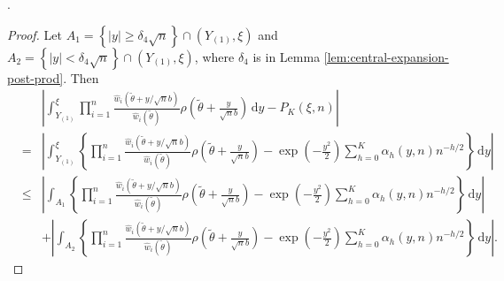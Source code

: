 \documentclass[oneside,english]{amsbook}
\numberwithin{section}{chapter}
\numberwithin{equation}{section}
\numberwithin{figure}{section}
\theoremstyle{plain}
\theoremstyle{plain}
\theoremstyle{definition}
\theoremstyle{plain}
\theoremstyle{plain}
\theoremstyle{remark}
\theoremstyle{definition}
\theoremstyle{definition}
\newcommand{\diff}{\,\mathrm{d}}
\begin{document}
. 
\begin{proof}
Let $A_{1}=\left\{ \left|y\right|\ge\delta_{4}\sqrt{n}\right\} \cap\left(Y_{\left(1\right)},\xi\right)$
and $A_{2}=\left\{ \left|y\right|<\delta_{4}\sqrt{n}\right\} \cap\left(Y_{\left(1\right)},\xi\right)$,
where $\delta_{4}$ is in Lemma \ref{lem:central-expansion-post-prod}.
Then 
\begin{eqnarray*}
 &  & \left|\int_{Y_{\left(1\right)}}^{\xi}\prod_{i=1}^{n}\frac{\hat{w}_{i}\left(\tilde{\theta}+y/\sqrt{n}b\right)}{\hat{w}_{i}\left(\tilde{\theta}\right)}\rho\left(\tilde{\theta}+\frac{y}{\sqrt{n}b}\right)\diff y-P_{K}\left(\xi,n\right)\right|\\
 & = & \left|\int_{Y_{\left(1\right)}}^{\xi}\left\{ \prod_{i=1}^{n}\frac{\hat{w}_{i}\left(\tilde{\theta}+y/\sqrt{n}b\right)}{\hat{w}_{i}\left(\tilde{\theta}\right)}\rho\left(\tilde{\theta}+\frac{y}{\sqrt{n}b}\right)-\exp\left(-\frac{y^{2}}{2}\right)\sum_{h=0}^{K}\alpha_{h}\left(y,n\right)n^{-h/2}\right\} \diff y\right|\\
 & \le & \left|\int_{A_{1}}\left\{ \prod_{i=1}^{n}\frac{\hat{w}_{i}\left(\tilde{\theta}+y/\sqrt{n}b\right)}{\hat{w}_{i}\left(\tilde{\theta}\right)}\rho\left(\tilde{\theta}+\frac{y}{\sqrt{n}b}\right)-\exp\left(-\frac{y^{2}}{2}\right)\sum_{h=0}^{K}\alpha_{h}\left(y,n\right)n^{-h/2}\right\} \diff y\right|\\
 &  & +\left|\int_{A_{2}}\left\{ \prod_{i=1}^{n}\frac{\hat{w}_{i}\left(\tilde{\theta}+y/\sqrt{n}b\right)}{\hat{w}_{i}\left(\tilde{\theta}\right)}\rho\left(\tilde{\theta}+\frac{y}{\sqrt{n}b}\right)-\exp\left(-\frac{y^{2}}{2}\right)\sum_{h=0}^{K}\alpha_{h}\left(y,n\right)n^{-h/2}\right\} \diff y\right|.
\end{eqnarray*}



\end{proof}
\end{document}
